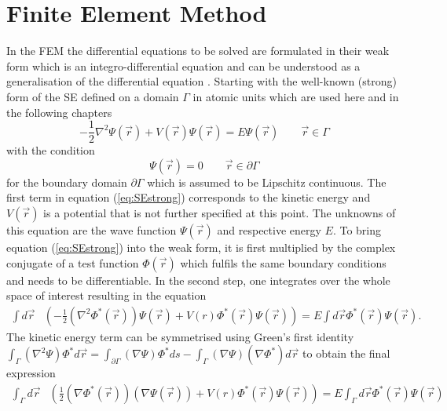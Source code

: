 {\section{Finite Element Method}
\label{ch:introFEM}
In the FEM the differential equations to be solved are formulated in their weak form which is an integro-differential equation and can be understood as a generalisation of the differential equation \cite{femBraess}.
Starting with the well-known (strong) form of the SE defined on a domain $ \Gamma$ in atomic units which are used here and in the following chapters
\begin{equation} \label{eq:SEstrong}
-\frac 12 \nabla^2\Psi(\vec{r})+ V(\vec{r})\Psi(\vec{r})=E \Psi(\vec{r}) \qquad  \vec{r}\in \Gamma
\end{equation}
with the condition 
\begin{equation}
    \Psi(\vec{r})=0  \qquad \vec{r} \in \partial \Gamma
\end{equation}
for the boundary domain $\partial \Gamma$ which is assumed to be Lipschitz continuous.
The first term in equation (\ref{eq:SEstrong}) corresponds to the kinetic energy and $V(\vec{r})$ is a potential that is not further specified at this point.
The unknowns of this equation are the wave function $\Psi(\vec{r})$ and respective energy $E$.
To bring equation (\ref{eq:SEstrong}) into the weak form, it is first multiplied by the complex conjugate of a test function $\Phi(\vec{r})$ which fulfils the same boundary conditions and needs to be differentiable.
In the second step, one integrates over the whole space of interest resulting in the equation
\begin{align}
\int d \vec{r} & \left( - \frac 12 \left(\nabla^2\Phi^*(\vec{r})\right)\Psi(\vec{r})
               + V(r) \Phi^*(\vec{r}) \Psi(\vec{r})\right) = E \int d \vec{r} \Phi^*(\vec{r}) \Psi(\vec{r}).
\end{align}
The kinetic energy term can be symmetrised using Green's first identity $\int_\Gamma (\nabla^2\Psi)\Phi^* d\vec{r}=\int_{\partial \Gamma} (\nabla\Psi)\Phi^* ds -\int_\Gamma (\nabla\Psi)(\nabla\Phi^*) d\vec{r}$ to obtain the final expression
\begin{align}\label{eq:SEweak}
\int_\Gamma d \vec{r} & \left(  \frac 12 \left(\nabla\Phi^*(\vec{r})\right) \left(\nabla\Psi(\vec{r})\right) 
               + V(r) \Phi^*(\vec{r}) \Psi(\vec{r})\right) = E \int_\Gamma d \vec{r} \Phi^*(\vec{r}) \Psi(\vec{r})\\

\end{align}}
